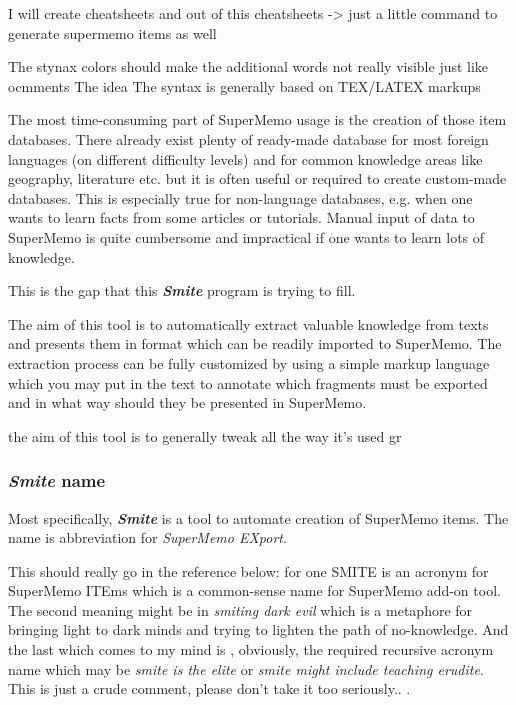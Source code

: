 \documentclass[a4paper,11pt]{article}
\newcommand{\smite}{\emph{\textbf{Smite{}}}}
\begin{document}
I will create cheatsheets and out of this cheatsheets -> just a little command
to generate supermemo items as well

The stynax colors should make the additional words not really visible just like
ocmments The idea The syntax is generally based on TEX/LATEX markups


The most time-consuming part of SuperMemo usage is the creation of those item
databases. There already exist plenty of ready-made database for most foreign
languages (on different difficulty levels) and for common knowledge areas like
geography, literature etc. but it is often useful or required to create
custom-made databases. This is especially true for non-language databases, e.g.
when one wants to learn facts from some articles or tutorials. Manual input of
data to SuperMemo is quite cumbersome and impractical if one wants to learn
lots of knowledge.

This is the gap that this \smite{} program is trying to fill.

The aim of this tool is to automatically extract valuable knowledge from texts
and presents them in format which can be readily imported to SuperMemo. The
extraction process can be fully customized by using a simple markup language
which you may put in the text to annotate which fragments must be exported and
in what way should they be presented in SuperMemo.


the aim of this tool is to generally tweak all the way it's used gr








\subsubsection{\smite{} name}

Most specifically, \smite{} is a tool to automate creation of SuperMemo items.
The name is abbreviation for \emph{SuperMemo EXport}.

This should really go in the reference below: for one SMITE is an acronym for
SuperMemo ITEms which is a common-sense name for SuperMemo add-on tool.  The
second meaning might be in \emph{smiting dark evil} which is a metaphore for
bringing light to dark minds and trying to lighten the path of no-knowledge.
And the last which comes to my mind is , obviously, the required recursive
acronym name which may be \emph{smite is the elite} or \emph{smite might
include teaching erudite}.  This is just a crude comment, please don't take it
too seriously.. .
\end{document}
